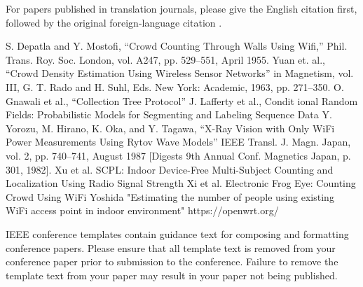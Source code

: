 \documentclass[conference]{IEEEtran}
\begin{document}
For papers published in translation journals, please give the English 
citation first, followed by the original foreign-language citation \cite{b6}.
\begin{thebibliography}{00}
 S. Depatla and Y. Mostofi, ``Crowd Counting Through Walls Using Wifi,'' Phil. Trans. Roy. Soc. London, vol. A247, pp. 529--551, April 1955.
 Yuan et. al., ``Crowd Density Estimation Using Wireless Sensor Networks'' in Magnetism, vol. III, G. T. Rado and H. Suhl, Eds. New York: Academic, 1963, pp. 271--350.
 O. Gnawali et al., ``Collection Tree Protocol''
 J. Lafferty et al., Condit
ional Random Fields: Probabilistic Models for Segmenting and Labeling Sequence Data
 Y. Yorozu, M. Hirano, K. Oka, and Y. Tagawa, ``X-Ray Vision with Only WiFi Power Measurements Using Rytov Wave Models'' IEEE Transl. J. Magn. Japan, vol. 2, pp. 740--741, August 1987 [Digests 9th Annual Conf. Magnetics Japan, p. 301, 1982].
 Xu et al. SCPL: Indoor Device-Free Multi-Subject Counting and Localization Using Radio Signal Strength
 Xi et al. Electronic Frog Eye: Counting Crowd Using WiFi
 Yoshida "Estimating the number of people using existing WiFi access point
in indoor environment"
 https://openwrt.org/

\end{thebibliography}
\vspace{12pt}
\color{red}
IEEE conference templates contain guidance text for composing and formatting conference papers. Please ensure that all template text is removed from your conference paper prior to submission to the conference. Failure to remove the template text from your paper may result in your paper not being published.
\end{document}
